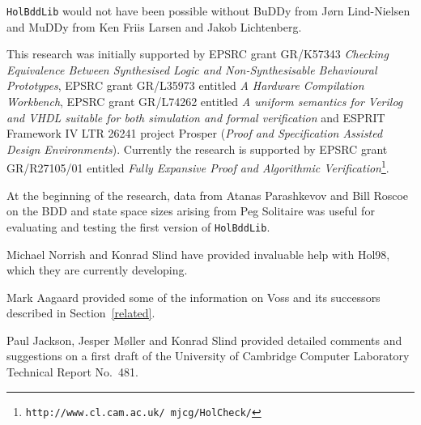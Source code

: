 \documentclass[12pt]{article}
\renewcommand{\t}[1]{\mbox{\tt #1}}
\newcommand\Hol{Hol98\xspace}
\newcommand{\Buddy}{BuDDy\xspace}
\newcommand{\Muddy}{MuDDy\xspace}
\begin{document}
\t{HolBddLib} would not have been possible without \Buddy from
J{\o}rn Lind-Nielsen and \Muddy from Ken Friis Larsen and Jakob Lichtenberg.

This research was initially supported by EPSRC grant
GR/K57343 {\em Checking Equivalence Between Synthesised Logic and
Non-Synthesisable Behavioural Prototypes}, EPSRC grant GR/L35973
entitled {\it A Hardware Compilation Workbench\/}, EPSRC grant
GR/L74262 entitled {\it A uniform semantics for Verilog and VHDL
suitable for both simulation and formal verification\/} and ESPRIT
Framework IV LTR 26241 project Prosper ({\em Proof and Specification
Assisted Design Environments}). Currently the research is supported by
EPSRC grant GR/R27105/01 entitled {\it Fully Expansive Proof and
Algorithmic Verification\/}\footnote{\texttt{http://www.cl.cam.ac.uk/~mjcg/HolCheck/}}.

At the beginning of the research, data from Atanas Parashkevov
and Bill Roscoe on the BDD and state space sizes arising from Peg Solitaire
was useful for evaluating and testing the first version of \t{HolBddLib}.

Michael Norrish and Konrad Slind have provided invaluable help with
\Hol, which they are currently developing. 

Mark Aagaard provided some
of the information on Voss and its successors described in
Section~\ref{related}.

Paul Jackson, Jesper M\o{}ller and Konrad Slind provided detailed
comments and suggestions on a first draft of the University of
Cambridge Computer Laboratory Technical Report No.~481.

  

\clearpage
{}
\printindex[MLty]

\clearpage
{}
\printindex[MLbn]
\end{document}

